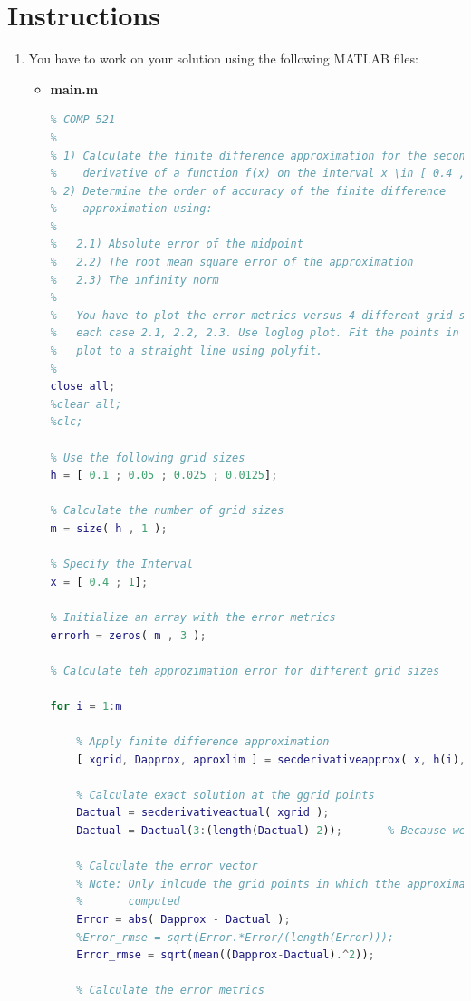 \documentclass[12pt,letterpaper]{article}
\begin{document}
\section*{Instructions}
\begin{enumerate}
	\item You have to work on your solution using the following MATLAB files:
\pagebreak
	\begin{itemize}
		\item \textbf{main.m}
        \begin{lstlisting}[language = Matlab]
%% MAIN Program for HW 3
% COMP 521
%
% 1) Calculate the finite difference approximation for the second
%    derivative of a function f(x) on the interval x \in [ 0.4 , 1]
% 2) Determine the order of accuracy of the finite difference
%    approximation using:
%
%   2.1) Absolute error of the midpoint
%   2.2) The root mean square error of the approximation
%   2.3) The infinity norm
%
%   You have to plot the error metrics versus 4 different grid sizes for
%   each case 2.1, 2.2, 2.3. Use loglog plot. Fit the points in the loglog
%   plot to a straight line using polyfit.
%
close all; 
%clear all; 
%clc; 

% Use the following grid sizes
h = [ 0.1 ; 0.05 ; 0.025 ; 0.0125];

% Calculate the number of grid sizes
m = size( h , 1 );

% Specify the Interval
x = [ 0.4 ; 1];

% Initialize an array with the error metrics
errorh = zeros( m , 3 );

% Calculate teh approzimation error for different grid sizes

for i = 1:m
    
    % Apply finite difference approximation
    [ xgrid, Dapprox, aproxlim ] = secderivativeapprox( x, h(i), @Fx );
    
    % Calculate exact solution at the ggrid points
    Dactual = secderivativeactual( xgrid );
    Dactual = Dactual(3:(length(Dactual)-2));       % Because we are ignoring the first 2 and last 2 indexes
    
    % Calculate the error vector
    % Note: Only inlcude the grid points in which tthe approximation was 
    %       computed
    Error = abs( Dapprox - Dactual );
    %Error_rmse = sqrt(Error.*Error/(length(Error)));
    Error_rmse = sqrt(mean((Dapprox-Dactual).^2));
    
    % Calculate the error metrics
    

\end{lstlisting}
\end{itemize}
\end{enumerate}
\end{document}
